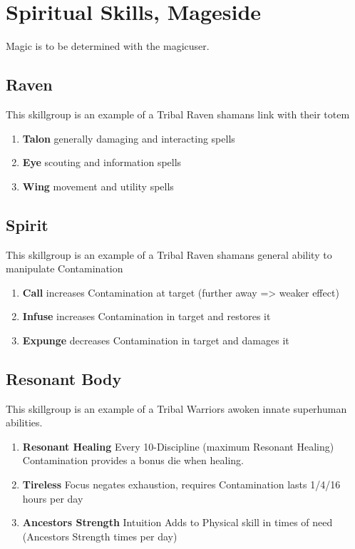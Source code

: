 \section{Spiritual Skills, Mageside}\label{sec:spiritual-skills,-magicside}
Magic is to be determined with the magicuser.

\subsection{Raven}\label{subsec:raven}
This skillgroup is an example of a Tribal Raven shamans link with their totem
\begin{enumerate}[label= - ]
    \item \textbf{Talon} generally damaging and interacting spells
    \item \textbf{Eye} scouting and information spells
    \item \textbf{Wing} movement and utility spells
\end{enumerate}

\subsection{Spirit}\label{subsec:spirit}
This skillgroup is an example of a Tribal Raven shamans general ability to manipulate Contamination
\begin{enumerate}[label= - ]
    \item \textbf{Call} increases Contamination at target (further away => weaker effect)
    \item \textbf{Infuse} increases Contamination in target and restores it
    \item \textbf{Expunge} decreases Contamination in target and damages it
\end{enumerate}


\subsection{Resonant Body}\label{subsec:resonant-body}
This skillgroup is an example of a Tribal Warriors awoken innate superhuman abilities.
\begin{enumerate}[label= - ]
    \item \textbf{Resonant Healing} Every 10-Discipline (maximum Resonant Healing) Contamination
    provides a bonus die when healing.
    \item \textbf{Tireless} Focus negates exhaustion, requires Contamination lasts 1/4/16 hours per day
    \item \textbf{Ancestors Strength} Intuition Adds to Physical skill in times of need (Ancestors Strength times per day)
\end{enumerate}

